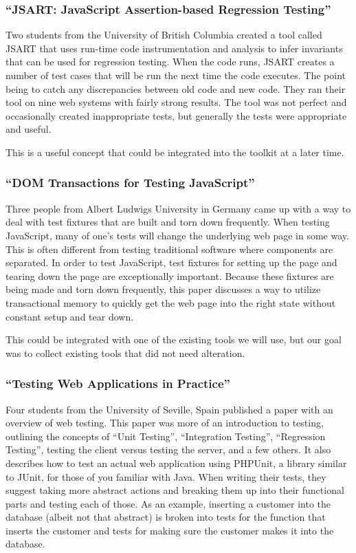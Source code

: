 \documentclass[11pt]{article}
\begin{document}
\subsubsection{``JSART: JavaScript Assertion-based Regression Testing'' \cite{JSART}}
Two students from the University of British Columbia created a tool called JSART that uses run-time code instrumentation and analysis to infer invariants that can be used for regression testing. When the code runs, JSART creates a number of test cases that will be run the next time the code executes. The point being to catch any discrepancies between old code and new code. They ran their tool on nine web systems with fairly strong results. The tool was not perfect and occasionally created inappropriate tests, but generally the tests were appropriate and useful.

This is a useful concept that could be integrated into the toolkit at a later time.

\subsubsection{``DOM Transactions for Testing JavaScript'' \cite{DOMTransactions}}
Three people from Albert Ludwigs University in Germany came up with a way to deal with test fixtures that are built and torn down frequently. When testing JavaScript, many of one's tests will change the underlying web page in some way. This is often different from testing traditional software where components are separated. In order to test JavaScript, test fixtures for setting up the page and tearing down the page are exceptionally important. Because these fixtures are being made and torn down frequently, this paper discusses a way to utilize transactional memory to quickly get the web page into the right state without constant setup and tear down.

This could be integrated with one of the existing tools we will use, but our goal was to collect existing tools that did not need alteration.

\subsubsection{``Testing Web Applications in Practice'' \cite{TestingInPractice}}
Four students from the University of Seville, Spain published a paper with an overview of web testing. This paper was more of an introduction to testing, outlining the concepts of “Unit Testing”, “Integration Testing”, “Regression Testing”, testing the client versus testing the server, and a few others. It also describes how to test an actual web application using PHPUnit, a library similar to JUnit, for those of you familiar with Java. When writing their tests, they suggest taking more abstract actions and breaking them up into their functional parts and testing each of those. As an example, inserting a customer into the database (albeit not that abstract) is broken into tests for the function that inserts the customer and tests for making sure the customer makes it into the database.
\end{document}
